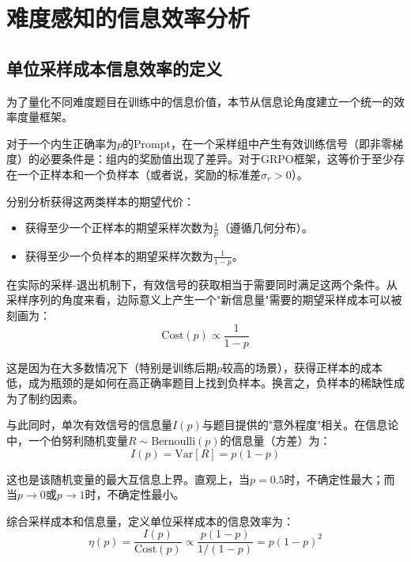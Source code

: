 \section{难度感知的信息效率分析}
\label{sec:information_efficiency}

\subsection{单位采样成本信息效率的定义}
\label{subsec:efficiency_definition}

为了量化不同难度题目在训练中的信息价值，本节从信息论角度建立一个统一的效率度量框架。

对于一个内生正确率为$p$的Prompt，在一个采样组中产生有效训练信号（即非零梯度）的必要条件是：组内的奖励值出现了差异。对于GRPO框架，这等价于至少存在一个正样本和一个负样本（或者说，奖励的标准差$\sigma_r > 0$）。

分别分析获得这两类样本的期望代价：
\begin{itemize}
    \item 获得至少一个正样本的期望采样次数为$\frac{1}{p}$（遵循几何分布）。
    \item 获得至少一个负样本的期望采样次数为$\frac{1}{1-p}$。
\end{itemize}

在实际的采样-退出机制下，有效信号的获取相当于需要同时满足这两个条件。从采样序列的角度来看，边际意义上产生一个"新信息量"需要的期望采样成本可以被刻画为：
\begin{equation}
\text{Cost}(p) \propto \frac{1}{1-p}
\label{eq:sampling_cost}
\end{equation}

这是因为在大多数情况下（特别是训练后期$p$较高的场景），获得正样本的成本低，成为瓶颈的是如何在高正确率题目上找到负样本。换言之，负样本的稀缺性成为了制约因素。

与此同时，单次有效信号的信息量$I(p)$与题目提供的"意外程度"相关。在信息论中，一个伯努利随机变量$R \sim \text{Bernoulli}(p)$的信息量（方差）为：
\begin{equation}
I(p) = \text{Var}[R] = p(1-p)
\label{eq:information_content}
\end{equation}

这也是该随机变量的最大互信息上界。直观上，当$p = 0.5$时，不确定性最大；而当$p \to 0$或$p \to 1$时，不确定性最小。

综合采样成本和信息量，定义单位采样成本的信息效率为：
\begin{equation}
\eta(p) = \frac{I(p)}{\text{Cost}(p)} \propto \frac{p(1-p)}{1/(1-p)} = p(1-p)^2
\label{eq:efficiency_function}
\end{equation}

